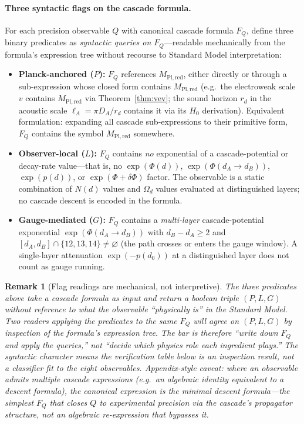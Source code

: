 \documentclass[12pt,a4paper]{article}
\newtheorem*{remark}{Remark}
\begin{document}
\paragraph{Three syntactic flags on the cascade formula.}
For each precision observable $Q$ with canonical cascade formula
$F_Q$, define three binary predicates as \emph{syntactic queries on
$F_Q$}---readable mechanically from the formula's expression tree
without recourse to Standard Model interpretation:
\begin{itemize}
\item \textbf{Planck-anchored ($P$):} $F_Q$ references $M_{\mathrm{Pl,red}}$,
either directly or through a sub-expression whose closed form
contains $M_{\mathrm{Pl,red}}$ (e.g.\ the electroweak scale $v$
contains $M_{\mathrm{Pl,red}}$ via Theorem~\ref{thm:vev}; the sound
horizon $r_d$ in the acoustic scale $\ell_A = \pi D_A/r_d$ contains
it via its $H_0$ derivation). Equivalent formulation: expanding all
cascade sub-expressions to their primitive form, $F_Q$ contains the
symbol $M_{\mathrm{Pl,red}}$ somewhere.
\item \textbf{Observer-local ($L$):} $F_Q$ contains \emph{no}
exponential of a cascade-potential or decay-rate value---that is,
no $\exp(\Phi(d))$, $\exp(\Phi(d_A \to d_B))$, $\exp(p(d))$, or
$\exp(\Phi + \delta\Phi)$ factor. The observable is a static
combination of $N(d)$ values and $\Omega_d$ values evaluated at
distinguished layers; no cascade descent is encoded in the formula.
\item \textbf{Gauge-mediated ($G$):} $F_Q$ contains a \emph{multi-layer}
cascade-potential exponential $\exp(\Phi(d_A \to d_B))$ with
$d_B - d_A \geq 2$ and $[d_A, d_B] \cap \{12, 13, 14\} \neq \varnothing$
(the path crosses or enters the gauge window). A single-layer
attenuation $\exp(-p(d_0))$ at a distinguished layer does not count
as gauge running.
\end{itemize}

\begin{remark}[Flag readings are mechanical, not interpretive]\label{rem:sp36-syntactic}
The three predicates above take a cascade formula as input and return
a boolean triple $(P,L,G)$ without reference to what the observable
``physically is'' in the Standard Model. Two readers applying the
predicates to the same $F_Q$ will agree on $(P,L,G)$ by inspection of
the formula's expression tree. The bar is therefore ``write down
$F_Q$ and apply the queries,'' not ``decide which physics role each
ingredient plays.'' The syntactic character means the verification
table below is an \emph{inspection result}, not a classifier fit to
the eight observables. Appendix-style caveat: where an observable
admits multiple cascade expressions (e.g.\ an algebraic identity
equivalent to a descent formula), the canonical expression is the
\emph{minimal descent formula}---the simplest $F_Q$ that closes $Q$
to experimental precision via the cascade's propagator structure, not
an algebraic re-expression that bypasses it.
\end{remark}
\end{document}
